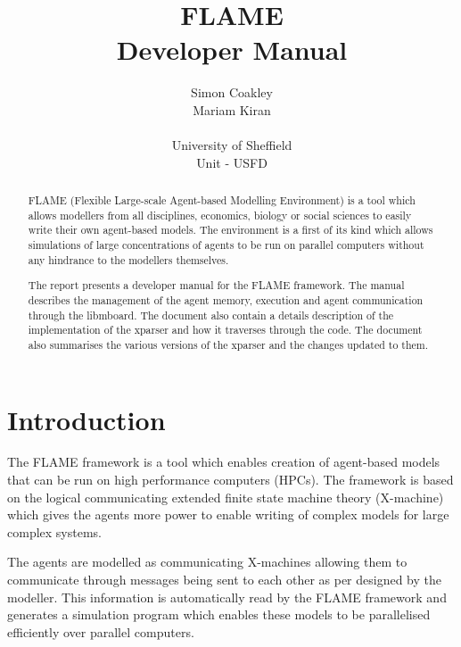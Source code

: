 \documentclass[a4paper,12pt]{article}
\begin{document}
\title{FLAME
\\Developer Manual}
\author{Simon Coakley
\\Mariam Kiran
\\
\\University of Sheffield\\ Unit - USFD}

\maketitle

\begin{abstract}

FLAME (Flexible Large-scale Agent-based Modelling Environment) is a
tool which allows modellers from all disciplines, economics, biology
or social sciences to easily write their own agent-based models. The
environment is a first of its kind which allows simulations of large
concentrations of agents to be run on parallel computers without any
hindrance to the modellers themselves.


The report presents a developer manual for the FLAME framework. The manual
describes the management of the agent memory, execution and
agent communication through the libmboard. The document also contain a details description of the implementation of the xparser and how it traverses through the code. The document also summarises the various versions of the xparser and the changes updated to them.
\end{abstract}

\pagebreak
\tableofcontents
\pagebreak


\section{Introduction}

The FLAME framework is a tool which enables creation of agent-based models
that can be run on high performance computers (HPCs). The framework
is based on the logical communicating extended finite state
machine theory (X-machine) which gives the agents more power to
enable writing of complex models for large complex systems.

The agents are modelled as communicating X-machines allowing them to
communicate through messages being sent to each other as per
designed by the modeller. This information is automatically read by
the FLAME framework and generates a simulation program which enables
these models to be parallelised efficiently over parallel computers.
\end{document}
